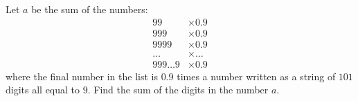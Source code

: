 Let $a$ be the sum of the numbers:
\begin{align*}
99 
& \times 0.9
\\
999 
& \times 0.9
\\
9999 
& \times 0.9
\\
\ldots
& \times \ldots
\\
999\ldots 9 
& \times 0.9
\end{align*}
where the final number in the list is $0.9$ times a number written as a string of $101$ digits all equal to $9$. Find the sum of the digits in the number $a$. 

